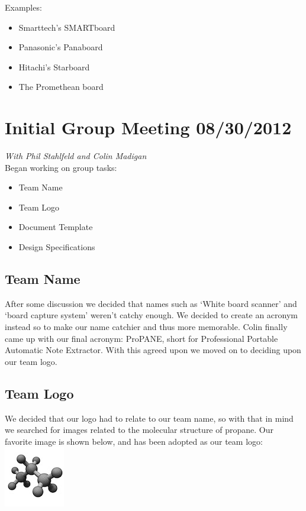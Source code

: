 \documentclass[]{article}
\begin{document}
			Examples:
			\begin{itemize}
				\item Smarttech’s SMARTboard 
				\item Panasonic’s Panaboard 
				\item Hitachi’s Starboard 
				\item The Promethean board 
			\end{itemize}

	
	\section{Initial Group Meeting 08/30/2012}
			\emph{With Phil Stahlfeld and Colin Madigan}\\
			
			Began working on group tasks:
			\begin{itemize}
				\item Team Name
				\item Team Logo
				\item Document Template
				\item Design Specifications
			\end{itemize}
			
		\subsection{Team Name}
			After some discussion we decided that names such as ‘White board scanner’ and ‘board capture system’ weren’t catchy enough. We decided to create an acronym instead so to make our name catchier and thus more memorable. Colin finally came up with our final acronym: ProPANE, short for Professional Portable Automatic Note Extractor. With this agreed upon we moved on to deciding upon our team logo. \\

		\subsection{Team Logo}
			We decided that our logo had to relate to our team name, so with that in mind we searched for images related to the molecular structure of propane. Our favorite image is shown below, and has been adopted as our team logo:\\
			\includegraphics{images/logo.jpeg}\\
\end{document}
